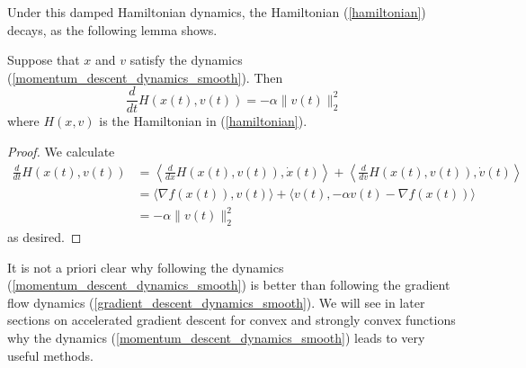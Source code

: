 Under this damped Hamiltonian dynamics, the Hamiltonian (\ref{hamiltonian}) decays, as the following lemma shows.
\begin{lemma}\label{hamiltonian_decay}
 Suppose that $x$ and $v$ satisfy the dynamics (\ref{momentum_descent_dynamics_smooth}). Then
 \begin{equation}
  \frac{d}{dt}H(x(t),v(t)) = -\alpha\|v(t)\|_2^2
 \end{equation}
 where $H(x,v)$ is the Hamiltonian in (\ref{hamiltonian}).

\end{lemma}
\begin{proof}
 We calculate
 \begin{align}
  \frac{d}{dt}H(x(t),v(t)) &= \left\langle\frac{d}{dx}H(x(t),v(t)), \dot{x}(t)\right\rangle + 
  \left\langle\frac{d}{dv}H(x(t),v(t)), \dot{v}(t)\right\rangle \\
   &= \langle \nabla f(x(t)), v(t)\rangle + \langle v(t), -\alpha v(t) - \nabla f(x(t))\rangle \\
   &= -\alpha\|v(t)\|_2^2
 \end{align}
  as desired.
\end{proof}

It is not a priori clear why following the dynamics (\ref{momentum_descent_dynamics_smooth}) is better than following the
gradient flow dynamics (\ref{gradient_descent_dynamics_smooth}). We will see in later sections on accelerated gradient
descent for convex and strongly convex functions why the dynamics (\ref{momentum_descent_dynamics_smooth}) leads to
very useful methods. 

